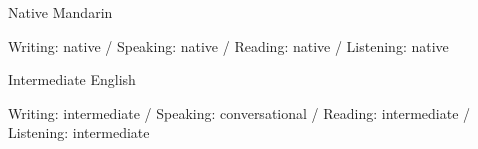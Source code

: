 

\begin{cventries}

    \cventry
        {Native}
        {Mandarin}
        {}
        {}
        {
            \begin{cvitems}
                \item {
		    Writing: native / Speaking: native / Reading: native / Listening: native
		}
            \end{cvitems}
        }

    \cventry
        {Intermediate} %
        {English} %
        {} %
        {} %
        {
            \begin{cvitems} %
                \item {
                    Writing: intermediate / Speaking: conversational / Reading: intermediate / Listening: intermediate
                }
          \end{cvitems}
        }


        
\end{cventries}
